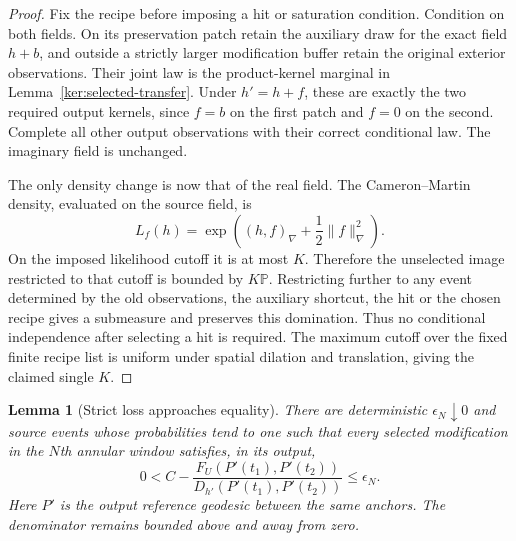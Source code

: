 \documentclass[11pt]{article}
\numberwithin{equation}{section}
\newtheorem{lemma}[theorem]{Lemma}
\theoremstyle{definition}
\theoremstyle{remark}
\newcommand{\1}{\mathbf 1}
\begin{document}
\begin{proof}
Fix the recipe before imposing a hit or saturation condition.
Condition on both fields.  On its preservation patch retain the
auxiliary draw for the exact field $h+b$, and outside a strictly
larger modification buffer retain the original exterior observations.
Their joint law is the product-kernel marginal in
Lemma~\ref{ker:selected-transfer}.  Under $h'=h+f$, these are
exactly the two required output kernels, since $f=b$ on the first
patch and $f=0$ on the second.  Complete all other output observations
with their correct conditional law.  The imaginary field is unchanged.

The only density change is now that of the real field.  The
Cameron--Martin density, evaluated on the source field, is
\[
 L_f(h)=\exp\left((h,f)_\nabla+\frac12\|f\|_\nabla^2\right).
\]
On the imposed likelihood cutoff it is at most $K$.  Therefore the
unselected image restricted to that cutoff is bounded by $K\mathbb P$.
Restricting further to any event determined by the old observations,
the auxiliary shortcut, the hit or the chosen recipe gives a
submeasure and preserves this domination.  Thus no conditional
independence after selecting a hit is required.  The maximum cutoff
over the fixed finite recipe list is uniform under spatial dilation
and translation, giving the claimed single $K$.
\end{proof}

\begin{lemma}[Strict loss approaches equality]
\label{met:near-equality}
There are deterministic $\epsilon_N\downarrow0$ and source events
whose probabilities tend to one such that every selected
modification in the $N$th annular window satisfies, in its output,
\begin{equation}
 0<C-
 \frac{F_U(P'(t_1),P'(t_2))}
      {D_{h'}(P'(t_1),P'(t_2))}
 \leq\epsilon_N.
 \label{met:near-equality-event}
\end{equation}
Here $P'$ is the output reference geodesic between the same anchors.
The denominator remains bounded above and away from zero.
\end{lemma}
\end{document}
